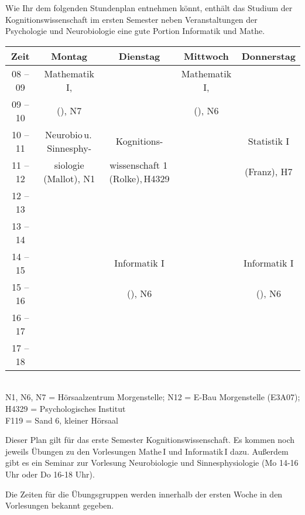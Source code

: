 Wie Ihr dem folgenden Stundenplan entnehmen könnt, enthält das Studium der Kognitionswissenschaft
im ersten Semester neben Veranstaltungen der Psychologie und Neurobiologie eine gute Portion Informatik und Mathe. 

\begin{center}
\small
\begin{tabular}{|c|c|c|c|c|} \hline
Zeit      & 			Montag 		& Dienstag							& Mittwoch 			& Donnerstag  \\
\hline\hline
08 -- 09  & 		Mathematik I, 	&									& Mathematik I, 	& \\
\cline{1-1}\cline{3-3}\cline{5-5}
09 -- 10  & 	(\Matheprof), N7	 & 									& (\Matheprof), N6 	&  \\
\cline{1-1}\cline{2-5}
10 -- 11 & Neurobio\,u.\,Sinnesphy- & Kognitions-						& 					& Statistik I \\
\cline{1-1}\cline{4-4}
11 -- 12 & siologie (Mallot), N1	& wissenschaft 1\,(Rolke),\,H4329	& 					& (Franz), H7 \\
\hline
12 -- 13 & & & & \\
\hline
13 -- 14 & & & & \\
\hline %
14 -- 15 &  						& Informatik I 						&					 & Informatik I  \\
\cline{1-2}\cline{4-4}
15 -- 16 &  						&  (\Infoprof), N6  				&					& (\Infoprof), N6  \\
\hline
16 -- 17 & & & &\\
\hline
17 -- 18 & & & & \\
\hline
\end{tabular}\\
\scriptsize  N1, N6, N7 = Hörsaalzentrum Morgenstelle; N12 = E-Bau Morgenstelle (E3A07); H4329 = Psychologisches Institut \\
F119 = Sand 6, kleiner Hörsaal
\end{center}

Dieser Plan gilt für das erste Semester Kognitionswissenschaft.
Es kommen noch jeweils Übungen zu den Vorlesungen Mathe\,I und Informatik\,I %
dazu.
Außerdem gibt es ein Seminar zur Vorlesung Neurobiologie und Sinnesphysiologie (Mo 14-16 Uhr oder Do 16-18 Uhr).

Die Zeiten für die Übungsgruppen werden innerhalb der ersten Woche in den Vorlesungen bekannt gegeben.
